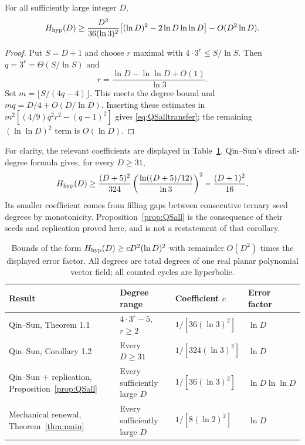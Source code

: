 \begin{proposition}\label{prop:QSall}
For all sufficiently large integer $D$,
\begin{equation}\label{eq:QSalltransfer}
 H_{\mathrm{hyp}}(D)\ge\frac{D^2}{36(\ln3)^2}
 \bigl[(\ln D)^2-2\ln D\ln\ln D\bigr]-O(D^2\ln D).
\end{equation}
\end{proposition}
\begin{proof}
Put $S=D+1$ and choose $r$ maximal with
$4\cdot3^r\le S/\ln S$. Then $q=3^r=\Theta(S/\ln S)$ and
\[
 r=\frac{\ln D-\ln\ln D+O(1)}{\ln3}.
\]
Set $m=\lfloor S/(4q-4)\rfloor$. This meets the degree bound and
$mq=D/4+O(D/\ln D)$. Inserting these estimates in
$m^2[(4/9)q^2r^2-(q-1)^2]$ gives \eqref{eq:QSalltransfer}; the
remaining $(\ln\ln D)^2$ term is $O(\ln D)$.
\end{proof}

For clarity, the relevant coefficients are displayed in
Table~\ref{tab:comparison}. Qin--Sun's direct all-degree formula
\cite[Corollary~1.2 and Sections~6.2, 6.4]{QinSun2026} gives, for every $D\ge31$,
\[
 H_{\mathrm{hyp}}(D)\ge\frac{(D+5)^2}{324}
 \left(\frac{\ln((D+5)/12)}{\ln3}\right)^2
 -\frac{(D+1)^2}{16}.
\]
Its smaller coefficient comes from filling gaps between consecutive
ternary seed degrees by monotonicity. Proposition~\ref{prop:QSall}
is the consequence of their seeds and replication proved here, and is
not a restatement of that corollary.

\begin{table}[htbp]
\centering\small
\begin{tabular}{@{}p{.34\linewidth}p{.22\linewidth}p{.19\linewidth}p{.17\linewidth}@{}}
\toprule
Result & Degree range & Coefficient $c$ & Error factor\\
\midrule
Qin--Sun, Theorem 1.1 & $4\cdot3^r-5$, $r\ge2$ & $1/[36(\ln3)^2]$ & $\ln D$\\[3pt]
Qin--Sun, Corollary 1.2 & Every $D\ge31$ & $1/[324(\ln3)^2]$ & $\ln D$\\[3pt]
Qin--Sun + replication, Proposition~\ref{prop:QSall} & Every sufficiently large $D$ & $1/[36(\ln3)^2]$ & $\ln D\ln\ln D$\\[3pt]
Mechanical renewal, Theorem~\ref{thm:main} & Every sufficiently large $D$ & $1/[8(\ln2)^2]$ & $\ln D$\\
\bottomrule
\end{tabular}
\caption{Bounds of the form $H_{\mathrm{hyp}}(D)\ge cD^2(\ln D)^2$
with remainder $O(D^2)$ times the displayed error factor. All degrees are total degrees of one real
planar polynomial vector field; all counted cycles are hyperbolic.}
\label{tab:comparison}
\end{table}
